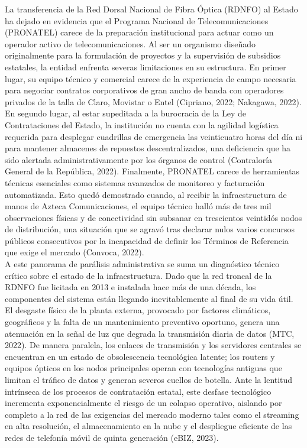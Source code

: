 La transferencia de la Red Dorsal Nacional de Fibra Óptica (RDNFO) al Estado ha dejado en evidencia 
que el Programa Nacional de Telecomunicaciones (PRONATEL) carece de la preparación institucional 
para actuar como un operador activo de telecomunicaciones. Al ser un organismo diseñado originalmente 
para la formulación de proyectos y la supervisión de subsidios estatales, la entidad enfrenta severas 
limitaciones en su estructura. En primer lugar, su equipo técnico y comercial carece de la experiencia de 
campo necesaria para negociar contratos corporativos de gran ancho de banda con operadores privados de 
la talla de Claro, Movistar o Entel (Cipriano, 2022; Nakagawa, 2022). En segundo lugar, al estar 
supeditada a la burocracia de la Ley de Contrataciones del Estado, la institución no cuenta con la agilidad 
logística requerida para desplegar cuadrillas de emergencia las veinticuatro horas del día ni para mantener almacenes de 
repuestos descentralizados, una deficiencia que ha sido alertada administrativamente por los órganos de control 
(Contraloría General de la República, 2022). Finalmente, PRONATEL carece de herramientas técnicas 
esenciales como sistemas avanzados de monitoreo y facturación automatizada. Esto quedó demostrado cuando, al 
recibir la infraestructura de manos de Azteca Comunicaciones, el equipo técnico halló más de tres mil observaciones 
físicas y de conectividad sin subsanar en trescientos veintidós nodos de distribución, una situación que se agravó tras declarar 
nulos varios concursos públicos consecutivos por la incapacidad de definir los Términos de Referencia que exige el mercado (Convoca, 2022).\\

A este panorama de parálisis administrativa se suma un diagnóstico técnico crítico sobre el estado de 
la infraestructura. Dado que la red troncal de la RDNFO fue licitada en 2013 e instalada hace más de una década, los 
componentes del sistema están llegando inevitablemente al final de su vida útil. El desgaste físico de la planta externa, 
provocado por factores climáticos, geográficos y la falta de un mantenimiento preventivo oportuno, genera una atenuación en la 
señal de luz que degrada la transmisión diaria de datos (MTC, 2022). De manera paralela, los enlaces de transmisión y los servidores 
centrales se encuentran en un estado de obsolescencia tecnológica latente; los routers y equipos ópticos en los nodos principales operan 
con tecnologías antiguas que limitan el tráfico de datos y generan severos cuellos de botella. Ante la lentitud intrínseca de los procesos 
de contratación estatal, este desfase tecnológico incrementa exponencialmente el riesgo de un colapso operativo, aislando por completo a la 
red de las exigencias del mercado moderno tales como el streaming en alta resolución, el almacenamiento en la nube y el despliegue eficiente 
de las redes de telefonía móvil de quinta generación (eBIZ, 2023).\\

